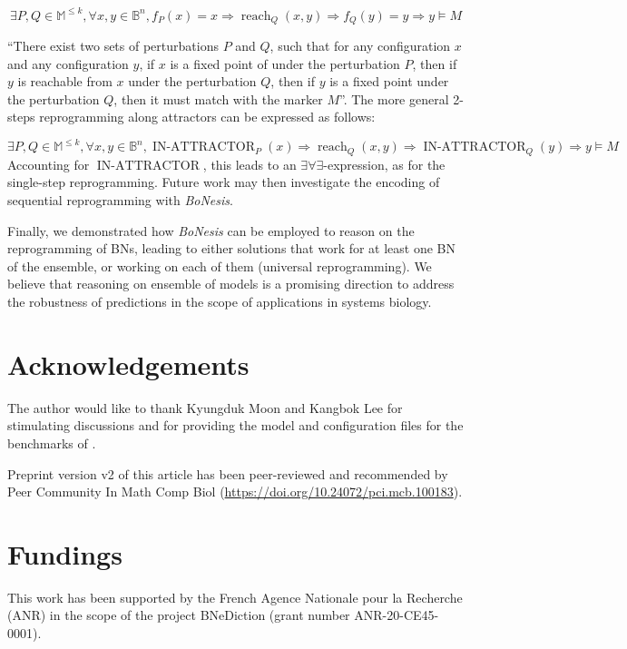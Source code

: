 \documentclass[PCJ,Unicode,screen,mode=plain]{cedram}
\begin{document}
\[\exists P,Q\in\mathbb M^{\leq k}, \forall x,y\in\mathbb B^n,
   f_P(x) = x \Rightarrow
      \operatorname{reach}_Q(x,y) \Rightarrow
      f_Q(y) = y \Rightarrow y\models M\]

``There exist two sets of perturbations \(P\) and \(Q\), such that for
any configuration \(x\) and any configuration \(y\), if \(x\) is a fixed
point of under the perturbation \(P\), then if \(y\) is reachable from
\(x\) under the perturbation \(Q\), then if \(y\) is a fixed point under
the perturbation \(Q\), then it must match with the marker \(M\)''. The
more general 2-steps reprogramming along attractors can be expressed as
follows:

\[\exists P,Q\in\mathbb M^{\leq k}, \forall x,y\in\mathbb B^n,
\operatorname{IN-ATTRACTOR}_P(x) \Rightarrow
     \operatorname{reach}_Q(x,y) \Rightarrow
     \operatorname{IN-ATTRACTOR}_Q(y) \Rightarrow y \models M\]
Accounting for \(\operatorname{IN-ATTRACTOR}\), this leads to an
\(\exists\forall\exists\)-expression, as for the single-step
reprogramming. Future work may then investigate the encoding of
sequential reprogramming with \emph{BoNesis}.

Finally, we demonstrated how \emph{BoNesis} can be employed to reason on
the reprogramming of BNs, leading to either solutions that work for at
least one BN of the ensemble, or working on each of them (universal
reprogramming). We believe that reasoning on ensemble of models is a
promising direction to address the robustness of predictions in the
scope of applications in systems biology.

\section*{Acknowledgements}

The author would like to thank Kyungduk Moon and Kangbok Lee for
stimulating discussions and for providing the model and configuration
files for the benchmarks of \citet{Moon22}.

Preprint version v2 of this article has been peer-reviewed and recommended by Peer Community In
Math Comp Biol (\url{https://doi.org/10.24072/pci.mcb.100183}).

\section*{Fundings}

This work has been supported by the French Agence Nationale pour la
Recherche (ANR) in the scope of the project
BNeDiction (grant number ANR-20-CE45-0001).
\end{document}
